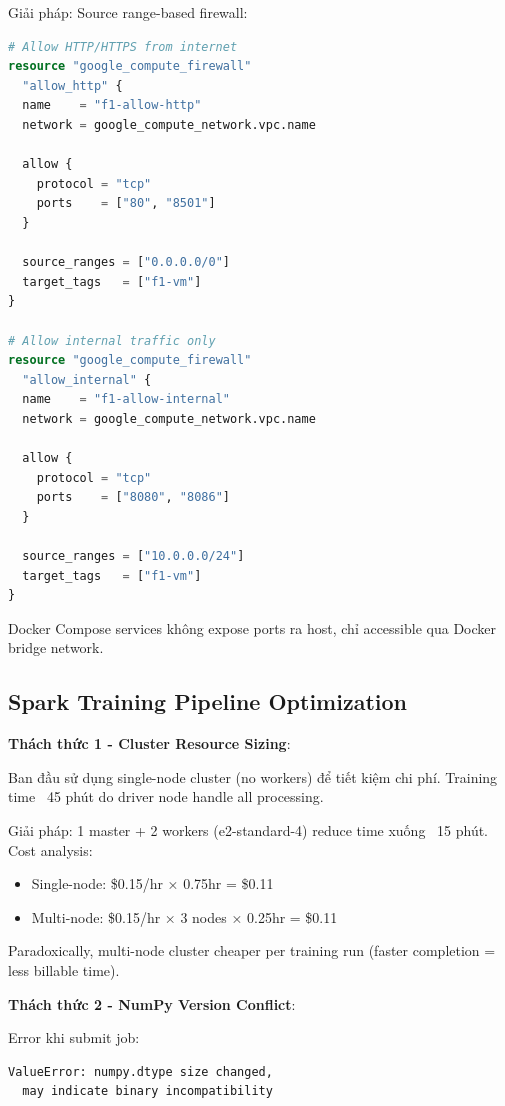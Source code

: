 \documentclass[conference,10pt]{IEEEtran}
\begin{document}
Giải pháp: Source range-based firewall:

\begin{lstlisting}[language=terraform]
# Allow HTTP/HTTPS from internet
resource "google_compute_firewall"
  "allow_http" {
  name    = "f1-allow-http"
  network = google_compute_network.vpc.name

  allow {
    protocol = "tcp"
    ports    = ["80", "8501"]
  }

  source_ranges = ["0.0.0.0/0"]
  target_tags   = ["f1-vm"]
}

# Allow internal traffic only
resource "google_compute_firewall"
  "allow_internal" {
  name    = "f1-allow-internal"
  network = google_compute_network.vpc.name

  allow {
    protocol = "tcp"
    ports    = ["8080", "8086"]
  }

  source_ranges = ["10.0.0.0/24"]
  target_tags   = ["f1-vm"]
}
\end{lstlisting}

Docker Compose services không expose ports ra host, chỉ accessible qua Docker bridge network.

\subsection{Spark Training Pipeline Optimization}

\textbf{Thách thức 1 - Cluster Resource Sizing}:

Ban đầu sử dụng single-node cluster (no workers) để tiết kiệm chi phí. Training time ~45 phút do driver node handle all processing.

Giải pháp: 1 master + 2 workers (e2-standard-4) reduce time xuống ~15 phút. Cost analysis:
\begin{itemize}
    \item Single-node: \$0.15/hr × 0.75hr = \$0.11
    \item Multi-node: \$0.15/hr × 3 nodes × 0.25hr = \$0.11
\end{itemize}

Paradoxically, multi-node cluster cheaper per training run (faster completion = less billable time).

\textbf{Thách thức 2 - NumPy Version Conflict}:

Error khi submit job:
\begin{verbatim}
ValueError: numpy.dtype size changed,
  may indicate binary incompatibility
\end{verbatim}
\end{document}

